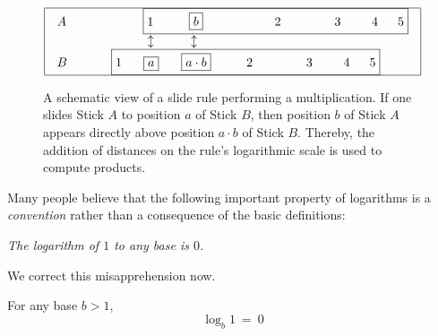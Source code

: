 \begin{figure}[htb]
\[ 
\begin{array}{|c|}
\hline
\begin{array}{ll}
A \hspace*{.35in} &
\hspace*{.35in}
\fbox{$1$ \hspace*{.3in} \fbox{$b$} 
\hspace*{.7in} $2$ 
\hspace*{.5in} $3$ 
\hspace*{.25in} $4$ 
\hspace*{.125in} $5$} \\ 
  &
\hspace*{.4in} \updownarrow \hspace*{.41in} \updownarrow \\
B \hspace*{.35in} &
\fbox{$1$\hspace*{.24in}\fbox{$a$}\hspace*{.25in}\fbox{$a \cdot b$}
\hspace*{.3in} $2$ 
\hspace*{.5in} $3$ 
\hspace*{.25in} $4$ 
\hspace*{.125in} $5$}
\end{array}
 \\
\hline
\end{array}
\]
\caption{A schematic view of a slide rule performing a multiplication.  If one slides Stick $A$ to position $a$ of Stick $B$, then position $b$ of Stick $A$ appears directly above position $a \cdot b$ of Stick $B$.  Thereby, the addition of distances on the rule's logarithmic scale is used to compute products.}
\label{fig:slide-rule}
\end{figure}

\bigskip

\noindent
Many people believe that the following important property of logarithms is a {\em convention} rather than a consequence of the basic definitions:

\smallskip

 {\em The logarithm of $1$ to any base is $0$.}

\smallskip

\noindent We correct this misapprehension now.

\smallskip

\begin{prop}
\label{thm:log1=0}
For any base $b >1$,
\[ \log_b 1 \ = \ 0 \]
\end{prop}

